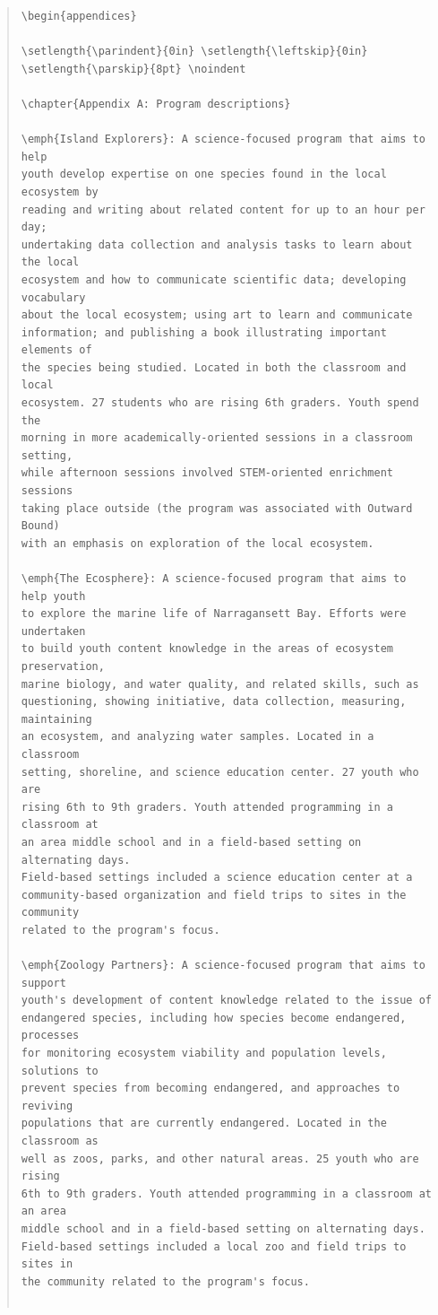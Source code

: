 \documentclass[]{msu-thesis}
\theoremstyle{definition}
\theoremstyle{definition}
\theoremstyle{definition}
\theoremstyle{remark}
\begin{document}
\begin{quote}
\begin{lstlisting}
\begin{appendices}

\setlength{\parindent}{0in} \setlength{\leftskip}{0in}
\setlength{\parskip}{8pt} \noindent

\chapter{Appendix A: Program descriptions}

\emph{Island Explorers}: A science-focused program that aims to help
youth develop expertise on one species found in the local ecosystem by
reading and writing about related content for up to an hour per day;
undertaking data collection and analysis tasks to learn about the local
ecosystem and how to communicate scientific data; developing vocabulary
about the local ecosystem; using art to learn and communicate
information; and publishing a book illustrating important elements of
the species being studied. Located in both the classroom and local
ecosystem. 27 students who are rising 6th graders. Youth spend the
morning in more academically-oriented sessions in a classroom setting,
while afternoon sessions involved STEM-oriented enrichment sessions
taking place outside (the program was associated with Outward Bound)
with an emphasis on exploration of the local ecosystem.

\emph{The Ecosphere}: A science-focused program that aims to help youth
to explore the marine life of Narragansett Bay. Efforts were undertaken
to build youth content knowledge in the areas of ecosystem preservation,
marine biology, and water quality, and related skills, such as
questioning, showing initiative, data collection, measuring, maintaining
an ecosystem, and analyzing water samples. Located in a classroom
setting, shoreline, and science education center. 27 youth who are
rising 6th to 9th graders. Youth attended programming in a classroom at
an area middle school and in a field-based setting on alternating days.
Field-based settings included a science education center at a
community-based organization and field trips to sites in the community
related to the program's focus.

\emph{Zoology Partners}: A science-focused program that aims to support
youth's development of content knowledge related to the issue of
endangered species, including how species become endangered, processes
for monitoring ecosystem viability and population levels, solutions to
prevent species from becoming endangered, and approaches to reviving
populations that are currently endangered. Located in the classroom as
well as zoos, parks, and other natural areas. 25 youth who are rising
6th to 9th graders. Youth attended programming in a classroom at an area
middle school and in a field-based setting on alternating days.
Field-based settings included a local zoo and field trips to sites in
the community related to the program's focus.


\end{lstlisting}
\end{quote}
\end{document}
